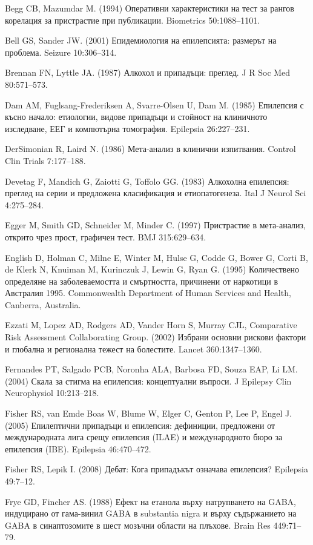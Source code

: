 \documentclass{article}
\begin{document}
Begg CB, Mazumdar M. (1994) Оперативни характеристики на тест за рангов корелация за пристрастие при публикации. Biometrics 50:1088–1101.

Bell GS, Sander JW. (2001) Епидемиология на епилепсията: размерът на проблема. Seizure 10:306–314.

Brennan FN, Lyttle JA. (1987) Алкохол и припадъци: преглед. J R Soc Med 80:571–573.

Dam AM, Fuglsang-Frederiksen A, Svarre-Olsen U, Dam M. (1985) Епилепсия с късно начало: етиологии, видове припадъци и стойност на клиничното изследване, ЕЕГ и компютърна томография. Epilepsia 26:227–231.

DerSimonian R, Laird N. (1986) Мета-анализ в клинични изпитвания. Control Clin Trials 7:177–188.

Devetag F, Mandich G, Zaiotti G, Toffolo GG. (1983) Алкохолна епилепсия: преглед на серии и предложена класификация и етиопатогенеза. Ital J Neurol Sci 4:275–284.

Egger M, Smith GD, Schneider M, Minder C. (1997) Пристрастие в мета-анализ, открито чрез прост, графичен тест. BMJ 315:629–634.

English D, Holman C, Milne E, Winter M, Hulse G, Codde G, Bower G, Corti B, de Klerk N, Knuiman M, Kurinczuk J, Lewin G, Ryan G. (1995) Количествено определяне на заболеваемостта и смъртността, причинени от наркотици в Австралия 1995. Commonwealth Department of Human Services and Health, Canberra, Australia.

Ezzati M, Lopez AD, Rodgers AD, Vander Horn S, Murray CJL, Comparative Risk Assessment Collaborating Group. (2002) Избрани основни рискови фактори и глобална и регионална тежест на болестите. Lancet 360:1347–1360.

Fernandes PT, Salgado PCB, Noronha ALA, Barbosa FD, Souza EAP, Li LM. (2004) Скала за стигма на епилепсия: концептуални въпроси. J Epilepsy Clin Neurophysiol 10:213–218.

Fisher RS, van Emde Boas W, Blume W, Elger C, Genton P, Lee P, Engel J. (2005) Епилептични припадъци и епилепсия: дефиниции, предложени от международната лига срещу епилепсия (ILAE) и международното бюро за епилепсия (IBE). Epilepsia 46:470–472.

Fisher RS, Lepik I. (2008) Дебат: Кога припадъкът означава епилепсия? Epilepsia 49:7–12.

Frye GD, Fincher AS. (1988) Ефект на етанола върху натрупването на GABA, индуцирано от гама-винил GABA в substantia nigra и върху съдържанието на GABA в синаптозомите в шест мозъчни области на плъхове. Brain Res 449:71–79.
\end{document}
